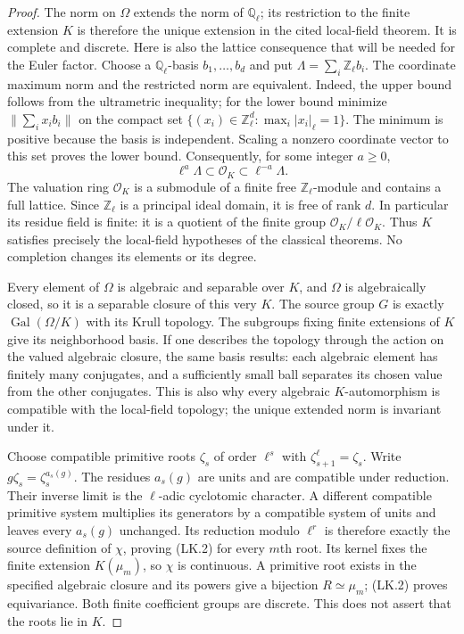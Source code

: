 \begin{proof}
The norm on $\Omega$ extends the norm of $\mathbb Q_\ell$; its
restriction to the finite extension $K$ is therefore the unique
extension in the cited local-field theorem.  It is complete and
discrete.  Here is also the lattice consequence that will be needed
for the Euler factor.  Choose a $\mathbb Q_\ell$-basis $b_1,\ldots,b_d$
and put $\Lambda=\sum_i\mathbb Z_\ell b_i$.  The coordinate maximum
norm and the restricted norm are equivalent.  Indeed, the upper bound
follows from the ultrametric inequality; for the lower bound minimize
$\|\sum_i x_i b_i\|$ on the compact set
$\{(x_i)\in\mathbb Z_\ell^d:\max_i|x_i|_\ell=1\}$.
The minimum is positive because the basis is independent.
Scaling a nonzero coordinate vector to this set proves the lower bound.
Consequently, for some integer $a\ge0$,
\[
 \ell^a\Lambda\subset\mathcal O_K\subset\ell^{-a}\Lambda.
 \tag{LK.3}
\]
The valuation ring $\mathcal O_K$ is a submodule of a finite free
$\mathbb Z_\ell$-module and contains a full lattice.  Since
$\mathbb Z_\ell$ is a principal ideal domain, it is free of rank $d$.
In particular its residue field is finite: it is a quotient of the
finite group $\mathcal O_K/\ell\mathcal O_K$.
Thus $K$ satisfies precisely the local-field hypotheses of the
classical theorems.  No completion changes its elements or its degree.

Every element of $\Omega$ is algebraic and separable over $K$, and
$\Omega$ is algebraically closed, so it is a separable closure of
this very $K$.  The source group $G$ is exactly
$\operatorname{Gal}(\Omega/K)$ with its Krull topology.  The subgroups
fixing finite extensions of $K$ give its neighborhood basis.  If one
describes the topology through the action on the valued algebraic
closure, the same basis results: each algebraic element has finitely
many conjugates, and a sufficiently small ball separates its chosen
value from the other conjugates.  This is also why every algebraic
$K$-automorphism is compatible with the local-field topology; the
unique extended norm is invariant under it.

Choose compatible primitive roots $\zeta_s$ of order $\ell^s$ with
$\zeta_{s+1}^{\ell}=\zeta_s$.  Write
$g\zeta_s=\zeta_s^{a_s(g)}$.  The residues $a_s(g)$ are units and
are compatible under reduction.  Their inverse limit is the
$\ell$-adic cyclotomic character.  A different compatible primitive
system multiplies its generators by a compatible system of units and
leaves every $a_s(g)$ unchanged.  Its reduction modulo $\ell^r$ is
therefore exactly the source definition of $\chi$, proving (LK.2)
for every $m$th root.  Its kernel fixes the finite extension $K(\mu_m)$,
so $\chi$ is continuous.  A primitive root exists in the specified
algebraic closure and its powers give a bijection $R\simeq\mu_m$;
(LK.2) proves equivariance.  Both finite coefficient groups are
discrete.  This does not assert that the roots lie in $K$.


\end{proof}
